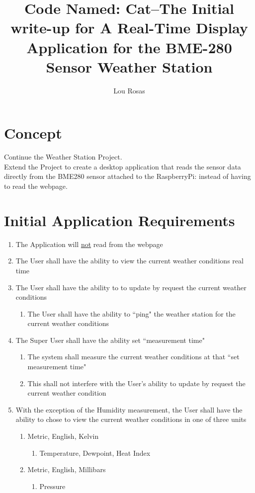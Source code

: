 \documentclass[letterpaper]{article}
\begin{document}
\title{Code Named: Cat--The Initial write-up for A Real-Time Display
Application for the BME-280 Sensor Weather Station}
\author{Lou Rosas}
\maketitle

\section{Concept}
Continue the Weather Station Project.\\
Extend the Project to create a desktop application that reads the
sensor data directly from the BME280 sensor attached to the
RaspberryPi:  instead of having to read the webpage.
\section{Initial Application Requirements}
\begin{enumerate}
\item The Application will \underline{not} read from the webpage
\item The User shall have the ability to view the current weather
conditions real time
\item The User shall have the ability to to update by request the
current weather conditions
\begin{enumerate}
\item{The User shall have the ability to ``ping" the weather station
for the current weather conditions}
\end{enumerate}
\item{The Super User shall have the ability set ``measurement time"}
\begin{enumerate}
\item{The system shall measure the current weather conditions at that
``set measurement time"}
\item{This shall not interfere with the User's ability to update by
request the current weather condition}
\end{enumerate}
\item{With the exception of the Humidity measurement, the User shall
have the ability to chose to view the current weather conditions in
one of three units}
\begin{enumerate}
\item{Metric, English, Kelvin}
\begin{enumerate}
\item{Temperature, Dewpoint, Heat Index}
\end{enumerate}
\item{Metric, English, Millibars}
\begin{enumerate}
\item{Pressure}
\end{enumerate}
\end{enumerate}
\end{enumerate}
\end{document}
